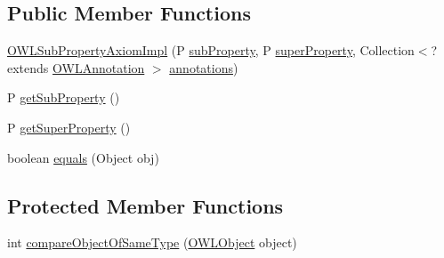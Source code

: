 \subsection*{Public Member Functions}
\begin{DoxyCompactItemize}
\item 
\hyperlink{classuk_1_1ac_1_1manchester_1_1cs_1_1owl_1_1owlapi_1_1_o_w_l_sub_property_axiom_impl_3_01_p_01ex22572232b03223b699ed74a4771c1e6d_a32dfd32a6a24641a0208ba5ceea039e4}{O\-W\-L\-Sub\-Property\-Axiom\-Impl} (P \hyperlink{classuk_1_1ac_1_1manchester_1_1cs_1_1owl_1_1owlapi_1_1_o_w_l_sub_property_axiom_impl_3_01_p_01ex22572232b03223b699ed74a4771c1e6d_a864678902eacd99c6e1821087a66c7a5}{sub\-Property}, P \hyperlink{classuk_1_1ac_1_1manchester_1_1cs_1_1owl_1_1owlapi_1_1_o_w_l_sub_property_axiom_impl_3_01_p_01ex22572232b03223b699ed74a4771c1e6d_a81fd31047eeab5c2f30bb015b090217c}{super\-Property}, Collection$<$?extends \hyperlink{interfaceorg_1_1semanticweb_1_1owlapi_1_1model_1_1_o_w_l_annotation}{O\-W\-L\-Annotation} $>$ \hyperlink{classuk_1_1ac_1_1manchester_1_1cs_1_1owl_1_1owlapi_1_1_o_w_l_axiom_impl_af6fbf6188f7bdcdc6bef5766feed695e}{annotations})
\item 
P \hyperlink{classuk_1_1ac_1_1manchester_1_1cs_1_1owl_1_1owlapi_1_1_o_w_l_sub_property_axiom_impl_3_01_p_01ex22572232b03223b699ed74a4771c1e6d_ac9745023d94461a7adb1b1a31887b953}{get\-Sub\-Property} ()
\item 
P \hyperlink{classuk_1_1ac_1_1manchester_1_1cs_1_1owl_1_1owlapi_1_1_o_w_l_sub_property_axiom_impl_3_01_p_01ex22572232b03223b699ed74a4771c1e6d_af5e406eecb768f04b51994c839bc2bfd}{get\-Super\-Property} ()
\item 
boolean \hyperlink{classuk_1_1ac_1_1manchester_1_1cs_1_1owl_1_1owlapi_1_1_o_w_l_sub_property_axiom_impl_3_01_p_01ex22572232b03223b699ed74a4771c1e6d_a33f3b0adb31c7e017dfedf0c1d11d988}{equals} (Object obj)
\end{DoxyCompactItemize}
\subsection*{Protected Member Functions}
\begin{DoxyCompactItemize}
\item 
int \hyperlink{classuk_1_1ac_1_1manchester_1_1cs_1_1owl_1_1owlapi_1_1_o_w_l_sub_property_axiom_impl_3_01_p_01ex22572232b03223b699ed74a4771c1e6d_af7c79dbc7612da1cebc4cf103164296f}{compare\-Object\-Of\-Same\-Type} (\hyperlink{interfaceorg_1_1semanticweb_1_1owlapi_1_1model_1_1_o_w_l_object}{O\-W\-L\-Object} object)
\end{DoxyCompactItemize}
